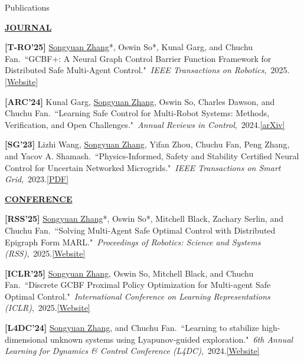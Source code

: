 \documentclass{resume} %
\newcommand{\paperItem}[4]{#1.~``#2."~\textit{#3},~#4.}%
\newcommand{\me}{\underline{Songyuan Zhang}}
\newcommand{\meshort}{\textbf{S. Zhang}}
\newcommand{\person}[2]{#1}
\begin{document}
	\begin{rSection}{Publications}
		\item[] \textbf{\underline{JOURNAL}}
		\vspace{5pt}
		{
			\item {\bf [T-RO'25]}
			\paperItem{\person{\me*}{\meshort}, \person{Oswin So*}{O. So}, \person{Kunal Garg}{K. Garg}, and \person{Chuchu Fan}{C. Fan}}{GCBF+: A Neural Graph Control Barrier Function Framework for Distributed Safe Multi-Agent Control}{IEEE Transactions on Robotics}{2025}{\href{https://mit-realm.github.io/gcbfplus/}{[Website]}}
			\item {\bf [ARC'24]}
			\paperItem{\person{Kunal Garg}{K. Garg}, \person{\me}{\meshort}, \person{Oswin So}{O. So}, \person{Charles Dawson}{C. Dawson}, and \person{Chuchu Fan}{C. Fan}}{Learning Safe Control for Multi-Robot Systems: Methods, Verification, and Open Challenges}{Annual Reviews in Control}{2024}{\href{https://arxiv.org/abs/2311.13714}{[arXiv]}}
			\item {\bf [SG'23]}
			\paperItem{\person{Lizhi Wang}{L. Wang}, \person{\me}{\meshort}, \person{Yifan Zhou}{Y. Zhou}, \person{Chuchu Fan}{C. Fan}, \person{Peng Zhang}{P. Zhang}, and \person{Yacov A. Shamash}{YA. Shamash}}{Physics-Informed, Safety and Stability Certified Neural Control for Uncertain Networked Microgrids}{IEEE Transactions on Smart Grid}{2023}{\href{https://ieeexplore.ieee.org/stamp/stamp.jsp?arnumber=10233047}{[PDF]}}
		}
		\vspace{5pt}
		\item[] \textbf{\underline{CONFERENCE}}
		\vspace{5pt}
		{	
			\item {\bf [RSS'25]}
			\paperItem{\person{\me*}{\meshort}, \person{Oswin So*}{O. So}, \person{Mitchell Black}{M. Black}, \person{Zachary Serlin}{Z. Serlin}, and \person{Chuchu Fan}{C. Fan}}{Solving Multi-Agent Safe Optimal Control with Distributed Epigraph Form MARL}{Proceedings of Robotics: Science and Systems (RSS)}{2025}{\href{https://mit-realm.github.io/def-marl/}{[Website]}}
			\item {\bf [ICLR'25]}
			\paperItem{\person{\me}{\meshort}, \person{Oswin So}{O. So}, \person{Mitchell Black}{M. Black}, and \person{Chuchu Fan}{C. Fan}}{Discrete GCBF Proximal Policy Optimization for Multi-agent Safe Optimal Control}{International Conference on Learning Representations (ICLR)}{2025}{\href{https://mit-realm.github.io/dgppo/}{[Website]}}
			\item {\bf [L4DC'24]}
			\paperItem{\person{\me}{\meshort}, and \person{Chuchu Fan}{C. Fan}}{Learning to stabilize high-dimensional unknown systems using Lyapunov-guided exploration}{6th Annual Learning for Dynamics \& Control Conference (L4DC)}{2024}{\href{https://mit-realm.github.io/lyge-website/}{[Website]}}
}
\end{rSection}
\end{document}
